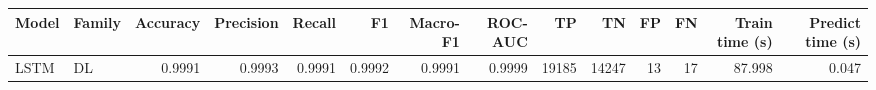 \begin{tabular}{llrrrrrrrrrrrr}
\toprule
Model & Family & Accuracy & Precision & Recall & F1 & Macro-F1 & ROC-AUC & TP & TN & FP & FN & Train time (s) & Predict time (s) \\
\midrule
LSTM & DL & 0.9991 & 0.9993 & 0.9991 & 0.9992 & 0.9991 & 0.9999 & 19185 & 14247 & 13 & 17 & 87.998 & 0.047 \\
\bottomrule
\end{tabular}

